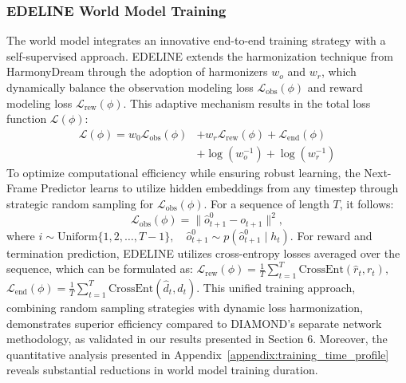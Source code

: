 \subsubsection{EDELINE World Model Training}
The world model integrates an innovative end-to-end training strategy with a self-supervised approach. EDELINE extends the harmonization technique from HarmonyDream \cite{ma2024harmonydream} through the adoption of harmonizers $w_o$ and $w_r$, which dynamically balance the observation modeling loss $\mathcal{L}_{\text{obs}}(\phi)$ and reward modeling loss $\mathcal{L}_{\text{rew}}(\phi)$. This adaptive mechanism results in the total loss function $\mathcal{L}(\phi)$:
\begin{equation}
\label{eq:total_loss}
\begin{split}
\mathcal{L}(\phi) = w_0\mathcal{L}_{\text{obs}}(\phi) &+ w_r\mathcal{L}_{\text{rew}}(\phi) + \mathcal{L}_{\text{end}}(\phi) \\
    &+ \log(w_o^{-1}) + \log(w_r^{-1})
\end{split}
\end{equation}
To optimize computational efficiency while ensuring robust learning, the Next-Frame Predictor learns to utilize hidden embeddings from any timestep through strategic random sampling for $\mathcal{L}_{\text{obs}}(\phi)$. For a sequence of length $T$, 
it follows:
\begin{equation}
\mathcal{L}_{\text{obs}}(\phi) = \|\hat{o}^0_{t+1} - o_{t+1}\|^2,
\end{equation}
where $i \sim \text{Uniform}\{1,2,\ldots,T-1\}, \quad \hat{o}^0_{t+1} \sim p(\hat{o}^0_{t+1} \mid h_t).$ For reward and termination prediction, EDELINE utilizes cross-entropy losses averaged over the sequence, which can be formulated as:
    $\mathcal{L}_{\text{rew}}(\phi) = \frac{1}{T}\sum_{t=1}^T \text{CrossEnt}(\hat{r}_t, r_t),$
    $\mathcal{L}_{\text{end}}(\phi) = \frac{1}{T}\sum_{t=1}^T \text{CrossEnt}(\hat{d}_t, d_t).$
This unified training approach, combining random sampling strategies with dynamic loss harmonization, demonstrates superior efficiency compared to DIAMOND's separate network methodology, as validated in our results presented in Section 6. Moreover, the quantitative analysis presented in Appendix~\ref{appendix:training_time_profile} reveals substantial reductions in world model training duration.
\vspace{-0.5em}

